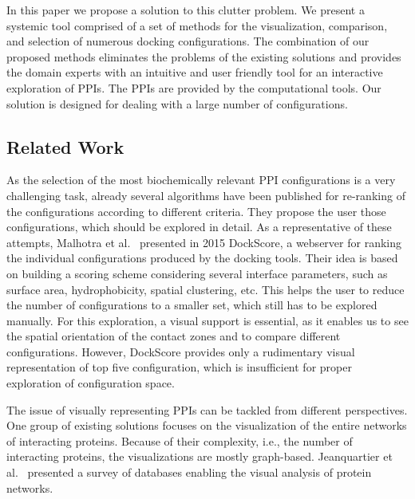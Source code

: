 \documentclass{bmcart}
\begin{document}
In this paper we propose a solution to this clutter problem.
We present a systemic tool comprised of a set of methods for the visualization, comparison, and selection of numerous docking configurations.
The combination of our proposed methods eliminates the problems of the existing solutions and provides the domain experts with an intuitive and user friendly tool for an interactive exploration of PPIs.
The PPIs are provided by the computational tools.
Our solution is designed for dealing with a large number of configurations. 

\subsection*{Related Work}
As the selection of the most biochemically relevant PPI configurations is a very challenging task, already several algorithms have been published for re-ranking of the configurations according to different criteria.
They propose the user those configurations, which should be explored in detail.
As a representative of these attempts, Malhotra et al.~\cite{Malhotra2015} presented in 2015 DockScore, a webserver for ranking the individual configurations produced by the docking tools. 
Their idea is based on building a scoring scheme considering several interface parameters, such as surface area, hydrophobicity, spatial clustering, etc.
This helps the user to reduce the number of configurations to a smaller set, which still has to be explored manually.
For this exploration, a visual support is essential, as it enables us to see the spatial orientation of the contact zones and to compare different configurations.
However, DockScore provides only a rudimentary visual representation of top five configuration, which is insufficient for proper exploration of configuration space.
 
The issue of visually representing PPIs can be tackled from different perspectives.
One group of existing solutions focuses on the visualization of the entire networks of interacting proteins.
Because of their complexity, i.e., the number of interacting proteins, the visualizations are mostly graph-based.
Jeanquartier et al.~\cite{Jeanquartier2015} presented a survey of databases enabling the visual analysis of protein networks.
\end{document}
